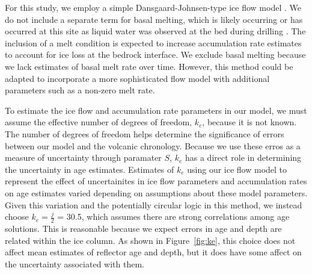 For this study, we employ a simple Dansgaard-Johnsen-type ice flow model \citep{schwander2001}. We do not include a separate term for basal melting, which is likely occurring or has occurred at this site as liquid water was observed at the bed during drilling \citep{gow1968}. The inclusion of a melt condition is expected to increase accumulation rate estimates to account for ice loss at the bedrock interface. We exclude basal melting because we lack estimates of basal melt rate over time. However, this method could be adapted to incorporate a more sophisticated flow model with additional parameters such as a non-zero melt rate. 



To estimate the ice flow and accumulation rate parameters in our model, we must assume the effective number of degrees of freedom, $k_e$,  because it is not known. The number of degrees of freedom helps determine the significance of errors between our model and the volcanic chronology. Because we use these erros as a measure of uncertainty through paramater $S$, $k_e$ has a direct role in determining the uncertainty in age estimates. Estimates of $k_e$ using our ice flow model to represent the effect of uncertainites in ice flow parameters and accumulation rates on age estimates varied depending on assumptions about these model parameters. Given this variation and the potentially circular logic in this method, we instead choose $k_e = \frac{j}{2}$ = 30.5, which assumes there are strong correlations among age solutions. This is reasonable because we expect errors in age and depth are related within the ice column. 
As shown in Figure~\ref{fig:ke}, this choice does not affect mean estimates of reflector age and depth, but it does have some affect on the uncertainty associated with them. 

